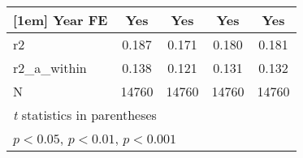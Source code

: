 {\begin{tabular}{l*{4}{c}}
[1em]
Year FE     &         Yes         &         Yes         &         Yes         &         Yes         \\
\hline
r2          &       0.187         &       0.171         &       0.180         &       0.181         \\
r2\_a\_within &       0.138         &       0.121         &       0.131         &       0.132         \\
N           &       14760         &       14760         &       14760         &       14760         \\
\hline\hline
\multicolumn{5}{l}{\footnotesize \textit{t} statistics in parentheses}\\
\multicolumn{5}{l}{\footnotesize \sym{*} \(p<0.05\), \sym{**} \(p<0.01\), \sym{***} \(p<0.001\)}\\
\end{tabular}
}
